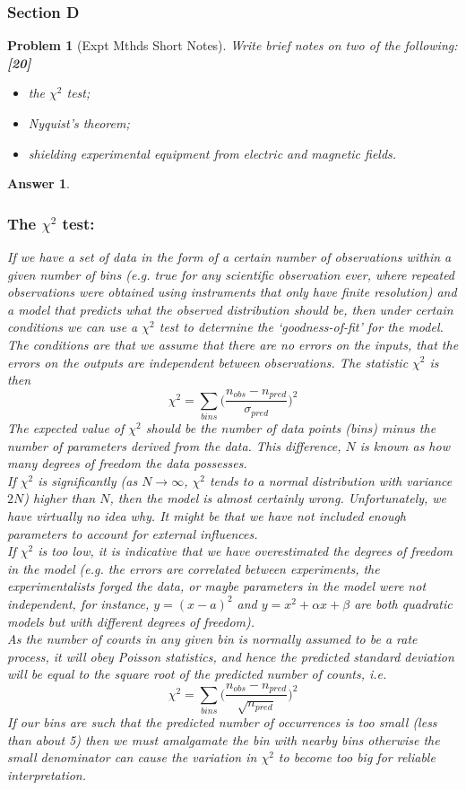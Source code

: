 \documentclass[a4paper]{article}
\newtheorem{ans}{Answer}[subsection]
\theoremstyle{new}
\newtheorem{qns}{Problem}[subsection]
\begin{document}
\subsubsection{Section D}
\begin{qns}[Expt Mthds Short Notes]
Write brief notes on two of the following:\hfill\textbf{[20]}
\begin{itemize}
    \item the $\chi^2$ test;
    \item Nyquist's theorem;
    \item shielding experimental equipment from electric and magnetic fields.
\end{itemize}
\end{qns}
\begin{ans}\leavevmode
\subsubsection*{The $\chi^2$ test:}
If we have a set of data in the form of a certain number of observations within a given number of bins (e.g. true for any scientific observation ever, where repeated observations were obtained using instruments that only have finite resolution) and a model that predicts what the observed distribution should be, then under certain conditions we can use a $\chi^2$ test to determine the `goodness-of-fit' for the model.\\[5pt]
The conditions are that we assume that there are no errors on the inputs, that the errors on the outputs are independent between observations. The statistic $\chi^2$ is then
$$\chi^2=\sum_{bins}\bigg(\frac{n_{obs}-n_{pred}}{\sigma_{pred}}\bigg)^2$$
The expected value of $\chi^2$ should be the number of data points (bins) minus the number of parameters derived from the data. This difference, $N$ is known as how many degrees of freedom the data possesses.\\[5pt]
If $\chi^2$ is significantly (as $N \rightarrow\infty$, $\chi^2$ tends to a normal distribution with variance $2N$) higher than $N$, then the model is almost certainly wrong. Unfortunately, we have virtually no idea why. It might be that we have not included enough parameters to account for external influences.\\[5pt]
If $\chi^2$ is too low, it is indicative that we have overestimated the degrees of freedom in the model (e.g. the errors are correlated between experiments, the experimentalists forged the data, or maybe parameters in the model were not independent, for instance, $y=(x-a)^2$ and $y=x^2+\alpha x+\beta$ are both quadratic models but with different degrees of freedom).\\[5pt]
As the number of counts in any given bin is normally assumed to be a rate process, it will obey Poisson statistics, and hence the predicted standard deviation will be equal to the square root of the predicted number of counts, i.e.
$$\chi^2=\sum_{bins}\bigg(\frac{n_{obs}-n_{pred}}{\sqrt{n_{pred}}}\bigg)^2$$
If our bins are such that the predicted number of occurrences is too small (less than about 5) then we must amalgamate the bin with nearby bins otherwise the small denominator can cause the variation in $\chi^2$ to become too big for reliable interpretation.
\newpage

\end{ans}
\end{document}

